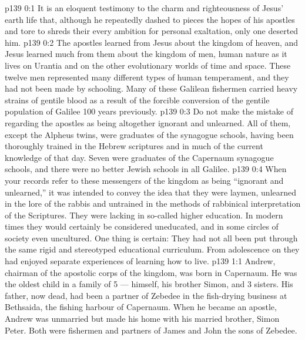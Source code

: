 \author{Midwayer Commission}
\vs p139 0:1 It is an eloquent testimony to the charm and righteousness of Jesus’ earth life that, although he repeatedly dashed to pieces the hopes of his apostles and tore to shreds their every ambition for personal exaltation, only one deserted him.
\vs p139 0:2 The apostles learned from Jesus about the kingdom of heaven, and Jesus learned much from them about the kingdom of men, human nature as it lives on Urantia and on the other evolutionary worlds of time and space. These twelve men represented many different types of human temperament, and they had not been made  by schooling. Many of these Galilean fishermen carried heavy strains of gentile blood as a result of the forcible conversion of the gentile population of Galilee 100 years previously.
\vs p139 0:3 \pc Do not make the mistake of regarding the apostles as being altogether ignorant and unlearned. All of them, except the Alpheus twins, were graduates of the synagogue schools, having been thoroughly trained in the Hebrew scriptures and in much of the current knowledge of that day. Seven were graduates of the Capernaum synagogue schools, and there were no better Jewish schools in all Galilee.
\vs p139 0:4 When your records refer to these messengers of the kingdom as being “ignorant and unlearned,” it was intended to convey the idea that they were laymen, unlearned in the lore of the rabbis and untrained in the methods of rabbinical interpretation of the Scriptures. They were lacking in so\hyp{}called higher education. In modern times they would certainly be considered uneducated, and in some circles of society even uncultured. One thing is certain: They had not all been put through the same rigid and stereotyped educational curriculum. From adolescence on they had enjoyed separate experiences of learning how to live.
\vs p139 1:1 Andrew, chairman of the apostolic corps of the kingdom, was born in Capernaum. He was the oldest child in a family of 5 --- himself, his brother Simon, and 3 sisters. His father, now dead, had been a partner of Zebedee in the fish\hyp{}drying business at Bethsaida, the fishing harbour of Capernaum. When he became an apostle, Andrew was unmarried but made his home with his married brother, Simon Peter. Both were fishermen and partners of James and John the sons of Zebedee.
